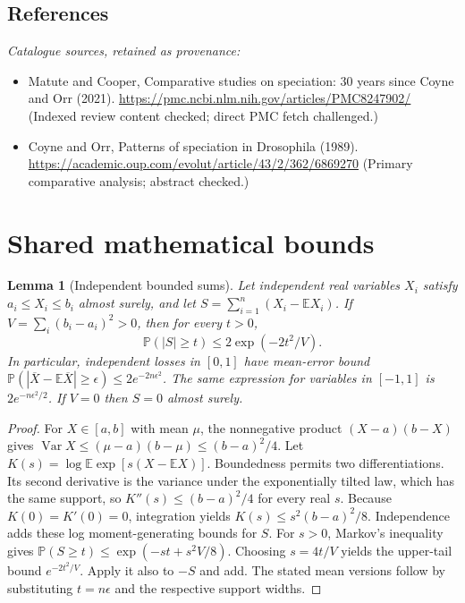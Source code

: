 \documentclass[11pt]{article}
\newcommand{\E}{\mathbb E}
\newcommand{\Prob}{\mathbb P}
\DeclareMathOperator{\Var}{Var}
\providecommand{\E}{\mathbb E}
\providecommand{\Prob}{\mathbb P}
\providecommand{\Var}{\operatorname{Var}}
\newtheorem{sharedlemma}{Lemma}[section]
\begin{document}
\subsection{References}
\noindent\emph{Catalogue sources, retained as provenance:}
\begin{itemize}
\item Matute and Cooper, Comparative studies on speciation: 30 years since Coyne and Orr (2021). \url{https://pmc.ncbi.nlm.nih.gov/articles/PMC8247902/} (Indexed review content checked; direct PMC fetch challenged.)
\item Coyne and Orr, Patterns of speciation in Drosophila (1989). \url{https://academic.oup.com/evolut/article/43/2/362/6869270} (Primary comparative analysis; abstract checked.)
\end{itemize}
\clearpage


\appendix
\section{Shared mathematical bounds}\label{app:bounds}
\begin{sharedlemma}[Independent bounded sums]\label{lem:bounded}
Let independent real variables $X_i$ satisfy $a_i\leq X_i\leq b_i$ almost surely,
and let $S=\sum_{i=1}^n(X_i-\E X_i)$. If
$V=\sum_i(b_i-a_i)^2>0$, then for every $t>0$,
\[
 \Prob(|S|\geq t)\leq 2\exp(-2t^2/V).
\]
In particular, independent losses in $[0,1]$ have mean-error bound
$\Prob(|\overline X-\E\overline X|\geq\epsilon)
\leq2e^{-2n\epsilon^2}$. The same expression for variables in $[-1,1]$
is $2e^{-n\epsilon^2/2}$. If $V=0$ then $S=0$ almost surely.
\end{sharedlemma}
\begin{proof}
For $X\in[a,b]$ with mean $\mu$, the nonnegative product
$(X-a)(b-X)$ gives
$\Var X\leq(\mu-a)(b-\mu)\leq(b-a)^2/4$.
Let $K(s)=\log\E\exp[s(X-\E X)]$.
Boundedness permits two differentiations. Its second derivative is the variance
under the exponentially tilted law, which has the same support, so
$K''(s)\leq(b-a)^2/4$ for every real $s$.
Because $K(0)=K'(0)=0$, integration yields
$K(s)\leq s^2(b-a)^2/8$.
Independence adds these log moment-generating bounds for $S$.
For $s>0$, Markov's inequality gives
$\Prob(S\geq t)\leq\exp(-st+s^2V/8)$.
Choosing $s=4t/V$ yields the upper-tail bound $e^{-2t^2/V}$.
Apply it also to $-S$ and add. The stated mean versions follow by substituting
$t=n\epsilon$ and the respective support widths.
\end{proof}
\end{document}
